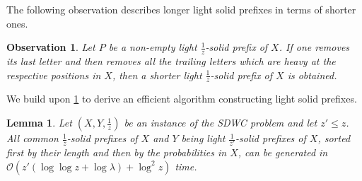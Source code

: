 \documentclass{article}
\theoremstyle{plain}
\newtheorem{lemma}[theorem]{Lemma}
\newtheorem{observation}[theorem]{Observation}
\theoremstyle{definition}
\newcommand{\SDWC}{\textsc{SDWC}\xspace}
\newcommand{\Oh}{\mathcal{O}}
\newcommand{\fr}{\ensuremath{\frac1z}}
\begin{document}
      The following observation describes longer light solid prefixes in terms of shorter ones.
      \begin{observation}\label{obs:light_step}
        Let $P$ be a non-empty light \fr-solid prefix of $X$.
        If one removes its last letter and then removes all the trailing letters which are heavy at the respective
        positions in $X$, then a shorter light \fr-solid prefix of $X$ is obtained.
      \end{observation}
	We build upon \cref{obs:light_step} to derive an efficient algorithm constructing light solid prefixes.\begin{lemma}\label{lem:lightprefixes_algo}
      Let $(X,Y,\fr)$ be an instance of the \SDWC problem and let $z'\le z$.
      All common \fr-solid prefixes of $X$ and $Y$ being light $\frac{1}{z'}$-solid prefixes of $X$,
      sorted first by their length and then by the probabilities in $X$,
      can be generated in $\Oh(z' (\log \log z+\log \lambda)+\log^2 z)$ time.
    \end{lemma}
\end{document}
